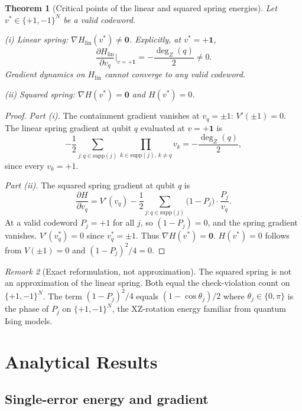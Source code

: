 \documentclass[12pt,a4paper]{article}
\theoremstyle{plain}
\newtheorem{theorem}{Theorem}[section]
\theoremstyle{definition}
\theoremstyle{remark}
\newtheorem{remark}[theorem]{Remark}
\newcommand{\dZ}{\operatorname{deg}_Z}
\begin{document}
\begin{theorem}[Critical points of the linear and squared spring energies]
\label{thm:critical}
Let $v^* \in \{+1,-1\}^N$ be a valid codeword.

\emph{(i) Linear spring:} $\nabla H_{\mathrm{lin}}(v^*) \neq \bm{0}$.
Explicitly, at $v^* = +\bm{1}$,
\[
  \frac{\partial H_{\mathrm{lin}}}{\partial v_q}\bigg|_{v=+\bm{1}}
  = -\frac{\dZ(q)}{2} \neq 0.
\]
Gradient dynamics on $H_{\mathrm{lin}}$ cannot converge to any valid codeword.

\emph{(ii) Squared spring:} $\nabla H(v^*) = \bm{0}$ and $H(v^*)=0$.
\end{theorem}

\begin{proof}
\emph{Part (i).}
The containment gradient vanishes at $v_q=\pm 1$: $V'(\pm 1) = 0$.
The linear spring gradient at qubit $q$ evaluated at $v=+\bm{1}$ is
\[
  -\frac{1}{2} \sum_{j: q\in\mathrm{supp}(j)} \prod_{k \in \mathrm{supp}(j),\, k\neq q} v_k
  = -\frac{\dZ(q)}{2},
\]
since every $v_k = +1$.

\emph{Part (ii).}
The squared spring gradient at qubit $q$ is
\[
  \frac{\partial H}{\partial v_q} = V'(v_q) -
    \frac{1}{2}\sum_{j: q\in\mathrm{supp}(j)}
    \bigl(1 - P_j\bigr)\cdot \frac{P_j}{v_q}.
\]
At a valid codeword $P_j = +1$ for all $j$, so $(1-P_j) = 0$, and
the spring gradient vanishes.
$V'(v_q^*) = 0$ since $v_q^* = \pm 1$.
Thus $\nabla H(v^*) = \bm{0}$.
$H(v^*)=0$ follows from $V(\pm 1)=0$ and $(1-P_j)^2/4 = 0$.
\end{proof}

\begin{remark}[Exact reformulation, not approximation]
The squared spring is not an approximation of the linear spring.
Both equal the check-violation count on $\{+1,-1\}^N$.
The term $(1-P_j)^2/4$ equals $(1-\cos\theta_j)/2$ where
$\theta_j \in \{0,\pi\}$ is the phase of $P_j$ on $\{+1,-1\}^N$,
the XZ-rotation energy familiar from quantum Ising models.
\end{remark}

\section{Analytical Results}\label{sec:analysis}

\subsection{Single-error energy and gradient}
\end{document}
